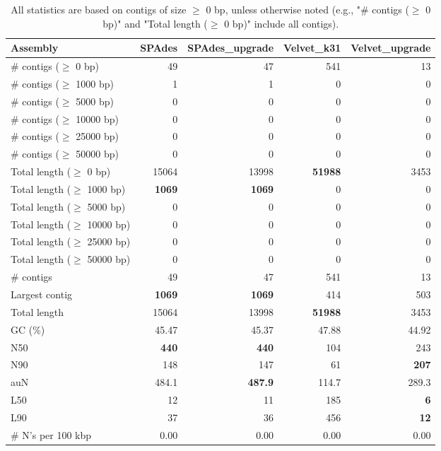 \documentclass[12pt,a4paper]{article}
\begin{document}
\begin{table}[ht]
\begin{center}
\caption{All statistics are based on contigs of size $\geq$ 0 bp, unless otherwise noted (e.g., "\# contigs ($\geq$ 0 bp)" and "Total length ($\geq$ 0 bp)" include all contigs).}
\begin{tabular}{|l*{4}{|r}|}
\hline
Assembly & SPAdes & SPAdes\_upgrade & Velvet\_k31 & Velvet\_upgrade \\ \hline
\# contigs ($\geq$ 0 bp) & 49 & 47 & 541 & 13 \\ \hline
\# contigs ($\geq$ 1000 bp) & 1 & 1 & 0 & 0 \\ \hline
\# contigs ($\geq$ 5000 bp) & 0 & 0 & 0 & 0 \\ \hline
\# contigs ($\geq$ 10000 bp) & 0 & 0 & 0 & 0 \\ \hline
\# contigs ($\geq$ 25000 bp) & 0 & 0 & 0 & 0 \\ \hline
\# contigs ($\geq$ 50000 bp) & 0 & 0 & 0 & 0 \\ \hline
Total length ($\geq$ 0 bp) & 15064 & 13998 & {\bf 51988} & 3453 \\ \hline
Total length ($\geq$ 1000 bp) & {\bf 1069} & {\bf 1069} & 0 & 0 \\ \hline
Total length ($\geq$ 5000 bp) & 0 & 0 & 0 & 0 \\ \hline
Total length ($\geq$ 10000 bp) & 0 & 0 & 0 & 0 \\ \hline
Total length ($\geq$ 25000 bp) & 0 & 0 & 0 & 0 \\ \hline
Total length ($\geq$ 50000 bp) & 0 & 0 & 0 & 0 \\ \hline
\# contigs & 49 & 47 & 541 & 13 \\ \hline
Largest contig & {\bf 1069} & {\bf 1069} & 414 & 503 \\ \hline
Total length & 15064 & 13998 & {\bf 51988} & 3453 \\ \hline
GC (\%) & 45.47 & 45.37 & 47.88 & 44.92 \\ \hline
N50 & {\bf 440} & {\bf 440} & 104 & 243 \\ \hline
N90 & 148 & 147 & 61 & {\bf 207} \\ \hline
auN & 484.1 & {\bf 487.9} & 114.7 & 289.3 \\ \hline
L50 & 12 & 11 & 185 & {\bf 6} \\ \hline
L90 & 37 & 36 & 456 & {\bf 12} \\ \hline
\# N's per 100 kbp & 0.00 & 0.00 & 0.00 & 0.00 \\ \hline
\end{tabular}
\end{center}
\end{table}
\end{document}
